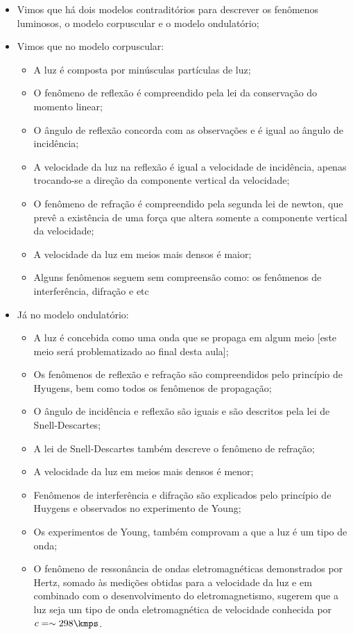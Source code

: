     \begin{itemize}
        \item Vimos que há dois modelos contraditórios para descrever os fenômenos luminosos, o modelo corpuscular e o modelo ondulatório;
        \item Vimos que no modelo corpuscular:
        \begin{itemize}
            \item A luz é composta por minúsculas partículas de luz;
            \item O fenômeno de reflexão é compreendido pela lei da conservação do momento linear;
            \item O ângulo de reflexão concorda com as observações e é igual ao ângulo de incidência;
            \item A velocidade da luz na reflexão é igual a velocidade de incidência, apenas trocando-se a direção da  componente vertical da velocidade;
            \item O fenômeno de refração é compreendido pela segunda lei de newton, que prevê a existência de uma força que altera somente a componente vertical da velocidade;
            \item A velocidade da luz em meios mais densos é maior;
            \item Alguns fenômenos seguem sem compreensão como: os fenômenos de interferência, difração e etc
        \end{itemize}
        \item Já no modelo ondulatório:
        \begin{itemize}
            \item A luz é concebida como uma onda que se propaga em algum meio [este meio será problematizado ao final desta aula];
            \item Os fenômenos de reflexão e refração são compreendidos pelo princípio de Hyugens, bem como todos os fenômenos de propagação;
            \item O ângulo de incidência e reflexão são iguais e são descritos pela lei de Snell-Descartes;
            \item A lei de Snell-Descartes também descreve o fenômeno de refração;
            \item A velocidade da luz em meios mais densos é menor;
            \item Fenômenos de interferência e difração são explicados pelo princípio de Huygens e observados no experimento de Young;
            \item Os experimentos de Young, também comprovam a que a luz é um tipo de onda;
            \item O fenômeno de ressonância de ondas eletromagnéticas demonstrados por Hertz, somado às medições obtidas para a velocidade da luz e em combinado com o desenvolvimento do eletromagnetismo, sugerem que a luz seja um tipo de onda eletromagnética de velocidade conhecida por $c=\sim 298\kmps$.
        \end{itemize}
    \end{itemize}

